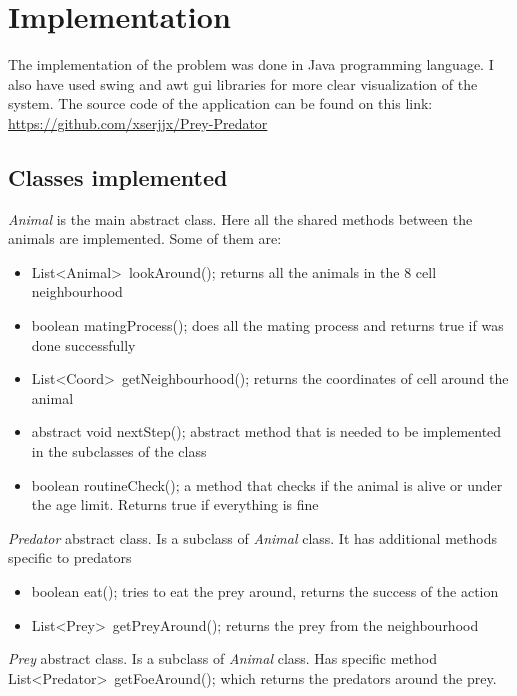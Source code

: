 \documentclass[11pt]{article}
\begin{document}
\section*{Implementation}
The implementation of the problem was done in Java programming language. I also have used swing and awt gui libraries for more clear visualization of the system. The source code of the application can be found on this link: \url{https://github.com/xserjjx/Prey-Predator}

\subsection*{Classes implemented}
\begin{description}

\item
\emph{Animal} is the main abstract class. Here all the shared methods between the animals are implemented. Some of them are:
	\begin{itemize}
	\item
	{\ttfamily List\textless Animal\textgreater\, lookAround();} returns all the animals in the 8 cell neighbourhood
	\item
	{\ttfamily boolean matingProcess();} does all the mating process and returns true if was done successfully
	\item
	{\ttfamily List\textless Coord\textgreater\, getNeighbourhood();} returns the coordinates of cell around the animal
	\item
	{\ttfamily abstract void nextStep();} abstract method that is needed to be implemented in the subclasses of the class
	\item
	{\ttfamily boolean routineCheck();} a method that checks if the animal is alive or under the age limit. Returns true if everything is fine
	\end{itemize}

\item
\emph{Predator} abstract class. Is a subclass of \emph{Animal} class. It has additional methods specific to predators
	\begin{itemize}
	\item
	{\ttfamily boolean eat();} tries to eat the prey around, returns the success of the action
	\item
	{\ttfamily List\textless Prey\textgreater\, getPreyAround();} returns the prey from the neighbourhood
	\end{itemize}

\item
\emph{Prey} abstract class. Is a subclass of \emph{Animal} class. Has specific method {\ttfamily List\textless Predator\textgreater\, getFoeAround();} which returns the predators around the prey.


\end{description}
\end{document}
